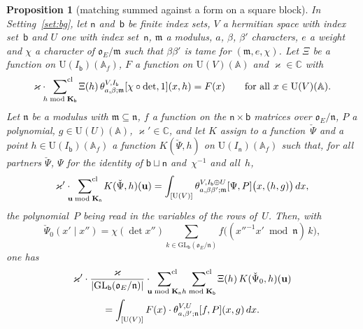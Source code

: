 \documentclass[11pt,a4paper]{article}
\newcommand{\m}[1]{\mbox{$#1$}}        %
\theoremstyle{plainx}
\newtheorem{proposition}[theorem]{Proposition}
\theoremstyle{uprightx}
\newcommand{\CC}{\mathbb{C}}
\newcommand{\AAA}{\mathbb{A}}
\newcommand{\ix}[1]{\mathsf{#1}}
\newcommand{\OEr}{\mathfrak{o}_E}
\newcommand{\UU}{\mathrm{U}}
\newcommand{\GL}{\mathrm{GL}}
\newcommand{\KK}[1]{\mathbf{K}_{#1}}
\newcommand{\clsum}[2]{\sideset{}{^{\mathrm{cl}}}\sum_{#1\bmod #2}}
\newcommand{\tk}[7]{\theta^{#1,#2}_{#3,#4;#5}[#6,#7]}
\newcommand{\dL}{\check{\Psi}}         %
\begin{document}
\begin{proposition}[matching summed against a form on a square block]\label{p:sum}
In Setting~\ref{set:bg}, let \m{\ix n} and~\m{\ix b} be finite index sets, $V$ a hermitian space with index
set~$\ix b$ and $U$ one with index set~$\ix n$, $\mathfrak{m}$ a modulus, $a$, $\beta$, $\beta'$ characters, $e$ a
weight and $\chi$ a character of \m{\OEr/\mathfrak{m}} such that \m{\beta\beta'} is tame for \m{(\mathfrak{m},e,\chi)}.
Let $\Xi$ be a function on \m{\UU(I_{\ix b})(\AAA_f)}, $F$ a function on \m{\UU(V)(\AAA)} and \m{\varkappa\in\CC} with
\begin{equation}\label{e:hF}
\varkappa\cdot\clsum{h}{\KK{\ix b}}\Xi(h)\,\tk{V}{I_{\ix b}}{a}{\beta}{\mathfrak{m}}{\chi\circ\det}{1}(x,h)=F(x)\qquad\text{for all }x\in\UU(V)(\AAA).
\end{equation}
Let $\mathfrak{n}$ be a modulus with \m{\mathfrak{m}\subseteq\mathfrak{n}}, $f$ a function on the \m{\ix n\times\ix b}
matrices over \m{\OEr/\mathfrak{n}}, $P$ a polynomial, \m{g\in\UU(U)(\AAA)}, \m{\varkappa'\in\CC}, and let $K$ assign to
a function~$\dL$ and a point \m{h\in\UU(I_{\ix b})(\AAA_f)} a function \m{K(\dL,h)} on \m{\UU(I_{\ix n})(\AAA_f)}
such that, for all partners $\dL$, $\Psi$ for the identity of \m{\ix b\sqcup\ix n} and~$\chi^{-1}$ and all~$h$,
\begin{equation}\label{e:hK}
\varkappa'\cdot\clsum{\mathbf{u}}{\KK{\ix n}}K(\dL,h)(\mathbf{u})=\int_{[\UU(V)]}\tk{V}{I_{\ix b}\oplus U}{a}{\beta\beta'}{\mathfrak{m}}{\Psi}{P}\bigl(x,(h,g)\bigr)\,dx,
\end{equation}
the polynomial~$P$ being read in the variables of the rows of~$U$. Then, with
\[\dL_0(x'\mid x'')=\chi(\det x'')\sum_{k\in\GL_{\ix b}(\OEr/\mathfrak{n})}f\bigl((x''^{-1}x'\bmod\mathfrak{n})\,k\bigr),\]
one has
\begin{multline*}
\varkappa'\cdot\frac{\varkappa}{|\GL_{\ix b}(\OEr/\mathfrak{n})|}\cdot\clsum{\mathbf{u}}{\KK{\ix n}}\ \clsum{h}{\KK{\ix b}}\Xi(h)\,K(\dL_0,h)(\mathbf{u})\\
=\int_{[\UU(V)]}F(x)\cdot\tk{V}{U}{a}{\beta'}{\mathfrak{n}}{f}{P}(x,g)\,dx .
\end{multline*}
\end{proposition}
\end{document}
